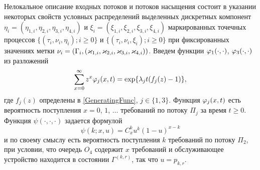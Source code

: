 \documentclass[a4paper,12pt,russian]{extarticle}
\newcommand{\ga}[1]{\Gamma^{\left( #1 \right)} }
\begin{document}
Нелокальное описание входных потоков и потоков насыщения состоит в указании некоторых свойств условных распределений выделенных дискретных компонент $\eta_i=(\eta_{1,i},\eta_{2,i}, \eta_{3,i}, \eta_{4,i})$ и $\xi_i=(\xi_{1,i}, \xi_{2,i}, \xi_{3,i}, \xi_{4,i})$ маркированных точечных процессов \linebreak $\{(\tau_i, \nu_i, \eta_i); i\geqslant 0\}$ и $\{(\tau_i, \nu_i, \xi_i); i\geqslant 0\}$ при фиксированных значениях метки $\nu_i = (\Gamma_i,(\varkappa_{1,i},\varkappa_{2,i},\varkappa_{3,i},\varkappa_{4,i}))$. 
Введем функции $\varphi_1(\cdot,\cdot)$, $\varphi_3(\cdot,\cdot)$ из разложений 
\begin{equation*}
\sum_{x=0}^{\infty} z^x\varphi_j(x,t) = \exp\{\lambda_j t (f_j(z)-1)\},
\end{equation*}
где $f_j(z)$ определены в \eqref{GeneratingFunc}, $j \in \{1,3\}$. Функция $\varphi_j(x,t)$ есть вероятность поступления $x=0$, $1$, $\ldots$ требований по потоку $\Pi_j$ за время $t \geqslant 0$. Функция $\psi(\cdot,\cdot,\cdot)$ задается формулой
\begin{equation*}
\psi(k;x,u)=C_x^k u^k (1-u)^{x-k}
\end{equation*}
и по своему смыслу есть вероятность поступления $k$ требований по потоку $\Pi_2$, при условии, что очередь $O_4$ содержит $x$ требований и обслуживающее устройство находится в состоянии $\ga{k,r}$, так что $u=p_{k,r}$.
\end{document}
